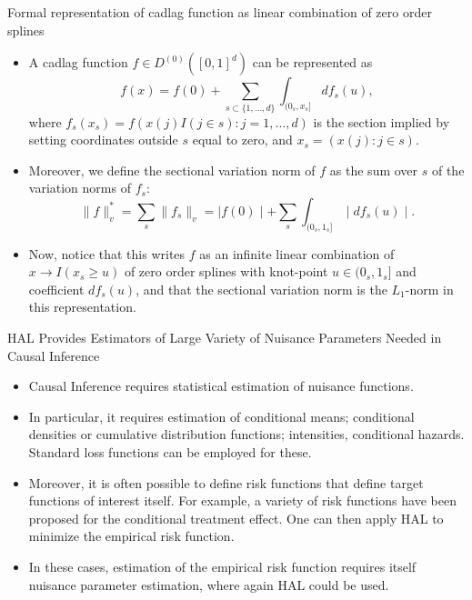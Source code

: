 \documentclass[t]{beamer}
\newlength{\wideitemsep}
\let\olditem\item
\renewcommand{\item}{\setlength{\itemsep}{\wideitemsep}\olditem}
\newcommand{\pl}{\parallel}
\begin{document}
\begin{frame}{Formal representation of cadlag function as linear combination of zero order splines}
\begin{itemize}
\item A cadlag function $f\in D^{(0)}([0,1]^d)$ can be represented as
\[
f(x)=f(0)+\sum_{s\subset\{1,\ldots,d\}}\int_{(0_s,x_s]}df_s(u),\]
where $f_s(x_s)=f(x(j)I(j\in s): j=1,\ldots,d)$ is the section implied by setting coordinates outside $s$ equal to zero, and $x_s=(x(j): j\in s)$.
\item Moreover, we define the sectional variation norm of $f$ as the sum over $s$ of the variation norms of $f_s$:
\[
\pl f\pl_v^*=\sum_s\pl f_s\pl_v=\mid f(0)\mid +\sum_s \int_{(0_s,1_s]}\mid df_s(u)\mid .\]
\end{itemize}
\end{frame}
\begin{frame}
\begin{itemize}
\item Now, notice that this writes $f$ as an infinite linear combination of $x\rightarrow I(x_s\geq u)$ of zero order splines with knot-point $u\in (0_s,1_s]$ and coefficient $df_s(u)$, and that the sectional variation norm is the $L_1$-norm in this representation.
\end{itemize}
\end{frame}

\begin{frame}{HAL Provides Estimators of Large Variety of Nuisance Parameters Needed in Causal Inference}
\begin{itemize}
\item Causal Inference requires statistical estimation of nuisance functions.
\item In particular, it requires  estimation of conditional means; conditional  densities or cumulative distribution functions; intensities, conditional hazards. Standard loss functions can be employed for these.
\item Moreover, it is often possible to define risk functions that define  target functions of interest itself. For example, a variety of risk functions have been proposed for the conditional treatment effect. One can then apply HAL to minimize the empirical risk function.
\item In these cases,  estimation of the empirical risk function requires itself nuisance parameter estimation, where again HAL could be used.
\end{itemize}
\end{frame}
\end{document}
